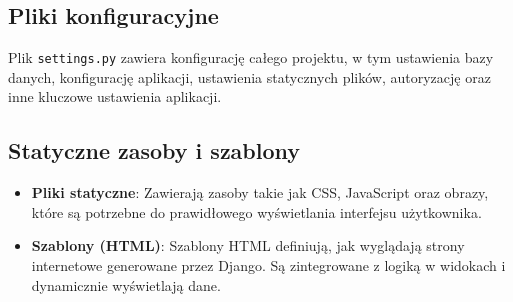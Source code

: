 \documentclass[../main.tex]{subfiles}
\begin{document}
\subsection{Pliki konfiguracyjne}
Plik \texttt{settings.py} zawiera konfigurację całego projektu, w tym ustawienia bazy danych, konfigurację aplikacji, ustawienia statycznych plików, autoryzację oraz inne kluczowe ustawienia aplikacji.

\subsection{Statyczne zasoby i szablony}
\begin{itemize}
	\item \textbf{Pliki statyczne}: Zawierają zasoby takie jak CSS, JavaScript oraz obrazy, które są potrzebne do prawidłowego wyświetlania interfejsu użytkownika.
	\item \textbf{Szablony (HTML)}: Szablony HTML definiują, jak wyglądają strony internetowe generowane przez Django. Są zintegrowane z logiką w widokach i dynamicznie wyświetlają dane.
\end{itemize}
\end{document}
